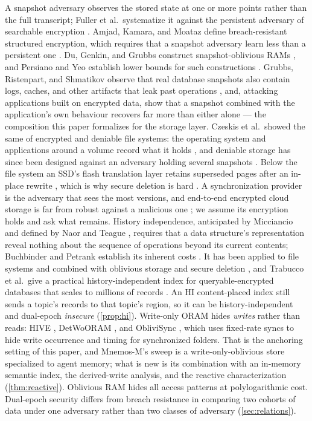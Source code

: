 A snapshot adversary observes the stored state at one or more points rather than the full
transcript; Fuller et al.\ systematize it against the persistent adversary of searchable encryption
\cite{fuller2017sok}. Amjad, Kamara, and Moataz define breach-resistant structured encryption, which
requires that a snapshot adversary learn less than a persistent one \cite{amjad2019breach}. Du,
Genkin, and Grubbs construct snapshot-oblivious RAMs \cite{du2022snapshot}, and Persiano and Yeo
establish lower bounds for such constructions \cite{persiano2023limits}. Grubbs, Ristenpart, and
Shmatikov observe that real database snapshots also contain logs, caches, and other artifacts that
leak past operations \cite{grubbs2017why}, and, attacking applications built on encrypted data,
show that a snapshot combined with the application's own behaviour recovers far more than either
alone \cite{grubbs2016breaking} --- the composition this paper formalizes for the storage layer.
Czeskis et al.\ showed the same of encrypted and deniable file systems: the operating
system and applications around a volume record what it holds \cite{czeskis2008defeating}, and
deniable storage has since been designed against an adversary holding several snapshots
\cite{peters2015defy}. Below the file system an SSD's flash translation layer retains superseded
pages after an in-place rewrite \cite{wei2011reliably}, which is why secure deletion is hard
\cite{reardon2013sok}. A synchronization provider is the adversary that sees the most versions,
and end-to-end encrypted cloud storage is far from robust against a malicious one
\cite{hofmann2024broken}; we assume its encryption holds and ask what remains. History
independence, anticipated by Micciancio
\cite{micciancio1997oblivious} and defined by Naor and Teague \cite{naor2001anti}, requires that a
data structure's representation reveal nothing about the sequence of operations beyond its current
contents; Buchbinder and Petrank establish its inherent costs \cite{buchbinder2006history}. It has
been applied to file systems \cite{bajaj2013hifs} and combined with oblivious
storage and secure deletion \cite{roche2016oblivious}, and Trabucco et al.\ give a practical
history-independent index for queryable-encrypted databases that scales to millions of records
\cite{trabucco2026history}. An HI content-placed index still sends a topic's records to that
topic's region, so it can be history-independent and dual-epoch \emph{insecure} (\cref{prop:hi}).
Write-only ORAM hides \emph{writes} rather than reads: HIVE \cite{blass2014hive}, DetWoORAM
\cite{roche2017detwooram}, and ObliviSync \cite{aviv2017oblivisync}, which uses fixed-rate syncs
to hide write occurrence and timing for synchronized folders. That is the anchoring setting of this
paper, and Mnemos-M's sweep is a write-only-oblivious store specialized to agent memory; what is new
is its combination with an in-memory semantic index, the derived-write analysis, and the reactive
characterization (\cref{thm:reactive}). Oblivious RAM \cite{goldreich1996software,stefanov2013path} hides all access
patterns at polylogarithmic cost. Dual-epoch security differs from breach resistance in comparing two
cohorts of data under one adversary rather than two classes of adversary (\cref{sec:relations}).


